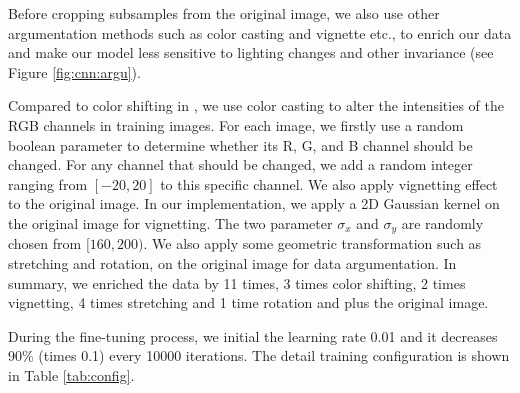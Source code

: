 Before cropping subsamples from the original image, we also use other argumentation methods such as color casting and vignette etc., to enrich our data and make our model less sensitive to lighting changes and other invariance (see Figure \ref{fig:cnn:argu}). 

Compared to color shifting in \cite{krizhevsky2012imagenet}, we use color casting to alter the intensities of the RGB channels in training images. For each image, we firstly use a random boolean parameter to determine whether its R, G, and B channel should be changed. For any channel that should be changed, we add a random integer ranging from $[-20 , 20]$ to this specific channel. We also apply vignetting effect to the original image. In our implementation, we apply a 2D Gaussian kernel on the original image for vignetting. The two parameter $\sigma_x$ and $\sigma_y$ are randomly chosen from $[160,200)$. We also apply some geometric transformation such as stretching and rotation, on the original image for data argumentation. In summary, we enriched the data by 11 times, 3 times color shifting, 2 times vignetting, 4 times stretching and 1 time rotation and plus the original image.

During the fine-tuning process, we initial the learning rate 0.01 and it decreases 90\% (times 0.1) every 10000 iterations. The detail training configuration is shown in Table \ref{tab:config}.

